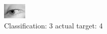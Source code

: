 \begin{figure}[h!]
\begin{center}
\includegraphics[width=0.60\columnwidth]{figures/ID2973_class_3_target_4.png}
\end{center}
\caption{ Classification: 3 actual target: 4}
\label{fig:ID2973_class_3_target_4}
\end{figure}
